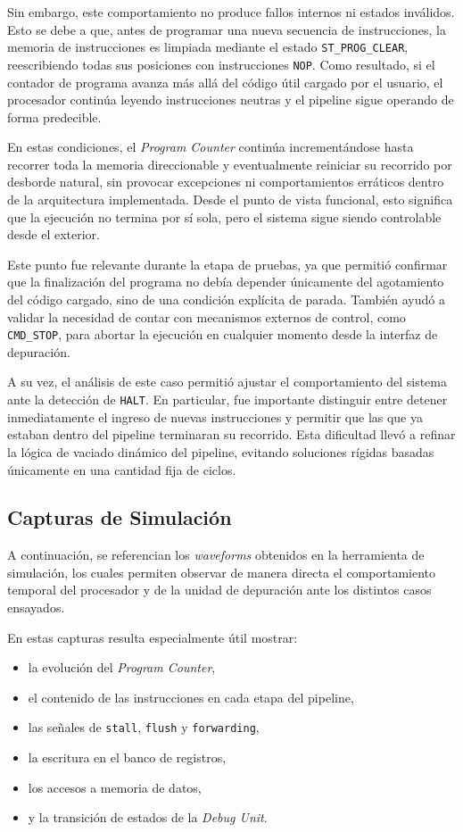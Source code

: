 Sin embargo, este comportamiento no produce fallos internos ni estados inválidos. Esto se debe a que, antes de programar una nueva secuencia de instrucciones, la memoria de instrucciones es limpiada mediante el estado \texttt{ST\_PROG\_CLEAR}, reescribiendo todas sus posiciones con instrucciones \texttt{NOP}. Como resultado, si el contador de programa avanza más allá del código útil cargado por el usuario, el procesador continúa leyendo instrucciones neutras y el pipeline sigue operando de forma predecible.

En estas condiciones, el \textit{Program Counter} continúa incrementándose hasta recorrer toda la memoria direccionable y eventualmente reiniciar su recorrido por desborde natural, sin provocar excepciones ni comportamientos erráticos dentro de la arquitectura implementada. Desde el punto de vista funcional, esto significa que la ejecución no termina por sí sola, pero el sistema sigue siendo controlable desde el exterior.

Este punto fue relevante durante la etapa de pruebas, ya que permitió confirmar que la finalización del programa no debía depender únicamente del agotamiento del código cargado, sino de una condición explícita de parada. También ayudó a validar la necesidad de contar con mecanismos externos de control, como \texttt{CMD\_STOP}, para abortar la ejecución en cualquier momento desde la interfaz de depuración.

A su vez, el análisis de este caso permitió ajustar el comportamiento del sistema ante la detección de \texttt{HALT}. En particular, fue importante distinguir entre detener inmediatamente el ingreso de nuevas instrucciones y permitir que las que ya estaban dentro del pipeline terminaran su recorrido. Esta dificultad llevó a refinar la lógica de vaciado dinámico del pipeline, evitando soluciones rígidas basadas únicamente en una cantidad fija de ciclos.

\subsection{Capturas de Simulación}
A continuación, se referencian los \textit{waveforms} obtenidos en la herramienta de simulación, los cuales permiten observar de manera directa el comportamiento temporal del procesador y de la unidad de depuración ante los distintos casos ensayados.

En estas capturas resulta especialmente útil mostrar:
\begin{itemize}
    \item la evolución del \textit{Program Counter},
    \item el contenido de las instrucciones en cada etapa del pipeline,
    \item las señales de \texttt{stall}, \texttt{flush} y \texttt{forwarding},
    \item la escritura en el banco de registros,
    \item los accesos a memoria de datos,
    \item y la transición de estados de la \textit{Debug Unit}.
\end{itemize}

